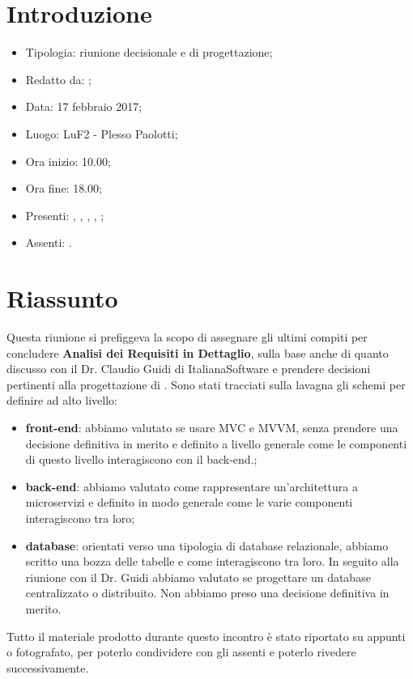 \section{Introduzione}

	\begin{itemize}
		\item Tipologia: riunione decisionale e di progettazione;
		\item Redatto da: \NS;
		\item Data: 17 febbraio 2017;
		\item Luogo: LuF2 - Plesso Paolotti;
		\item Ora inizio: 10.00;
		\item Ora fine: 18.00;
		\item Presenti: \AN, \DAN, \DS, \MC, \NS;
		\item Assenti: \AS.
	\end{itemize}

\section{Riassunto}
Questa riunione si prefiggeva la scopo di assegnare gli ultimi compiti per concludere \textbf{Analisi dei Requisiti in Dettaglio}, sulla base anche di quanto discusso con il Dr. Claudio Guidi di ItalianaSoftware e prendere decisioni pertinenti alla progettazione di \progetto. 
Sono stati tracciati sulla lavagna gli schemi per definire ad alto livello:
\begin{itemize}
	\item \textbf{front-end}: abbiamo valutato se usare MVC e MVVM, senza prendere una decisione definitiva in merito e definito a livello generale come le componenti di questo livello interagiscono con il back-end.;
	\item \textbf{back-end}: abbiamo valutato come rappresentare un'architettura a microservizi e definito in modo generale come le varie componenti interagiscono tra loro;
	\item \textbf{database}: orientati verso una tipologia di database relazionale, abbiamo scritto una bozza delle tabelle e come interagiscono tra loro. In seguito alla riunione con il Dr. Guidi abbiamo valutato se progettare un database centralizzato o distribuito. Non abbiamo preso una decisione definitiva in merito.
\end{itemize}
Tutto il materiale prodotto durante questo incontro è stato riportato su appunti o fotografato, per poterlo condividere con gli assenti e poterlo rivedere successivamente.
